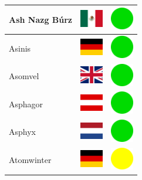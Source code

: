\documentclass[12pt, a4paper, twoside]{report}
\begin{document}
\begin{center}
\begin{longtable}{|p{5cm}|p{2cm}|p{2cm}|}
 Ash Nazg Búrz                                              & \includegraphics[width=1cm]{4x3/mx} &   \includegraphics[width=1cm]{likes/y} \\ \hline
 Asinis                                                     & \includegraphics[width=1cm]{4x3/de} &   \includegraphics[width=1cm]{likes/y} \\ \hline
 Asomvel                                                    & \includegraphics[width=1cm]{4x3/gb} &   \includegraphics[width=1cm]{likes/y} \\ \hline
 Asphagor                                                   & \includegraphics[width=1cm]{4x3/at} &   \includegraphics[width=1cm]{likes/y} \\ \hline
 Asphyx                                                     & \includegraphics[width=1cm]{4x3/nl} &   \includegraphics[width=1cm]{likes/y} \\ \hline
 Atomwinter                                                 & \includegraphics[width=1cm]{4x3/de} &   \includegraphics[width=1cm]{likes/m} \\ \hline

\end{longtable}
\end{center}
\end{document}
